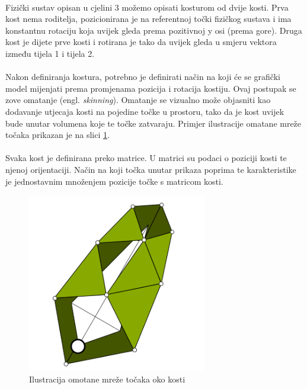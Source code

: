\documentclass[times, utf8, diplomski]{fer}
\begin{document}
\paragraph{}
Fizički sustav opisan u cjelini 3 možemo opisati kosturom od dvije kosti. Prva kost 
nema roditelja, pozicionirana je na referentnoj točki fizičkog sustava i ima 
konstantnu rotaciju koja uvijek gleda prema pozitivnoj y osi (prema gore). Druga kost 
je dijete prve kosti i rotirana je tako da uvijek gleda u smjeru vektora između tijela 1 
i tijela 2.

\paragraph{}
Nakon definiranja kostura, potrebno je definirati način na koji će se grafički model 
mijenjati prema promjenama pozicija i rotacija kostiju. Ovaj postupak se zove omatanje 
(engl. \textit{skinning}). Omatanje se vizualno može objasniti kao dodavanje utjecaja kosti 
na pojedine točke u prostoru, tako da je kost uvijek bude unutar volumena koje te točke 
zatvaraju. Primjer ilustracije omatane mreže točaka prikazan je na slici \ref{fig:41-1}.

\paragraph{}
Svaka kost je definirana preko matrice. U matrici su podaci o poziciji kosti te njenoj 
orijentaciji. Način na koji točka unutar prikaza poprima te karakteristike je jednostavnim 
množenjem pozicije točke s matricom kosti.

\begin{figure}[h]
	\centering
	\includegraphics[width=0.7\textwidth]{img/41-1}
	\caption{Ilustracija omotane mreže točaka oko kosti}
	\label{fig:41-1}
\end{figure}
\end{document}
